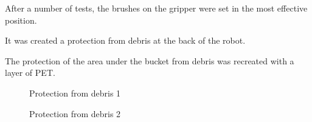 After a number of tests, the brushes on the gripper were set in the most effective position.

It was created a protection from debris at the back of the robot.

The protection of the area under the bucket from debris was recreated with a layer of PET.

\begin{figure}[H]
	\begin{minipage}[h]{0.47\linewidth}
		\caption{Protection from debris 1}
	\end{minipage}
	\hfill
	\begin{minipage}[h]{0.47\linewidth}
		\caption{Protection from debris 2}
	\end{minipage}
\end{figure}
